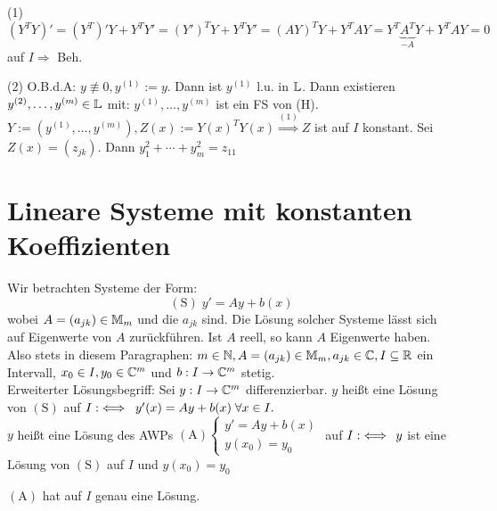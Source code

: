 \documentclass[a4paper,twoside,DIV15,BCOR12mm]{scrbook}
\begin{document}
\begin{beweise}
\item[(1)] $(Y^T Y)' = (Y^T)'Y + Y^T Y' = (Y')^T Y + Y^T Y' = (AY)^T Y + Y^T AY = Y^T \underbrace{A^T}_{-A} Y + Y^T AY = 0$ auf $I \Rightarrow$ Beh.
\item[(2)] O.B.d.A: $y \not\equiv 0, y^{(1)} := y.$ Dann ist $y^{(1)}$ l.u. in $\mathbb{L}$. Dann existieren $y^{(2)}, \dots , y^{(m)} \in \mathbb{L}$ mit: $y^{(1)}, \dots , y^{(m)}$ ist ein FS von (H). $Y:= (y^{(1)}, \dots , y^{(m)}), Z(x) := Y(x)^T Y(x) \stackrel{(1)}{\Rightarrow} Z$ ist auf $I$ konstant. Sei $Z(x) = (z_{jk}).$ Dann $y_1^2+ \cdots + y_m^2 = z_{11}$
\end{beweise}


\chapter{Lineare Systeme mit konstanten Koeffizienten}

Wir betrachten Systeme der Form:
$$(\text{S})\; y' = Ay + b(x)$$
wobei $A = (a_{jk}) \in \mathbb{M}_m$ und die $a_{jk}$  sind. Die Lösung solcher Systeme lässt sich auf Eigenwerte von $A$ zurückführen. Ist $A$ reell, so kann $A$  Eigenwerte haben. \\
Also stets in diesem Paragraphen: $m \in \mathbb{N}, A = (a_{jk}) \in \mathbb{M}_m, a_{jk} \in \mathbb{C}, I \subseteq \mathbb{R}$ ein Intervall, $x_0 \in I, y_0 \in \mathbb{C}^m$ und $b: I \rightarrow \mathbb{C}^m$ stetig.\\
Erweiterter Lösungsbegriff: Sei $y: I \rightarrow \mathbb{C}^m$ differenzierbar. $y$ heißt eine Lösung von $(\text{S})$ auf $I :\iff \; y'(x) = Ay + b(x) \; \forall x \in I.$ \\
$y$ heißt eine Lösung des AWPs $(\text{A}) \begin{cases} y' = Ay + b(x) \\ y(x_0) = y_0 \end{cases}$ auf $I :\iff \, y$ ist eine Lösung von $(\text{S})$ auf $I$ und $y(x_0) = y_0$

\begin{satz}
$(\text{A})$ hat auf $I$ genau eine Lösung.
\end{satz}
\end{document}
